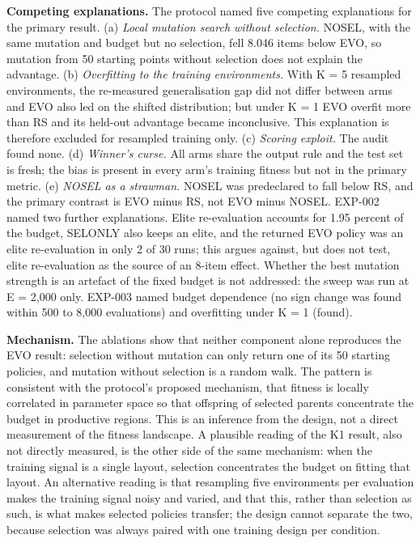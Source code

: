 \documentclass[
]{article}
\begin{document}
\textbf{Competing explanations.} The protocol named five competing
explanations for the primary result. (a) \emph{Local mutation search
without selection.} NOSEL, with the same mutation and budget but no
selection, fell 8.046 items below EVO, so mutation from 50 starting
points without selection does not explain the advantage. (b)
\emph{Overfitting to the training environments.} With K = 5 resampled
environments, the re-measured generalisation gap did not differ between
arms and EVO also led on the shifted distribution; but under K = 1 EVO
overfit more than RS and its held-out advantage became inconclusive.
This explanation is therefore excluded for resampled training only. (c)
\emph{Scoring exploit.} The audit found none. (d) \emph{Winner's curse.}
All arms share the output rule and the test set is fresh; the bias is
present in every arm's training fitness but not in the primary metric.
(e) \emph{NOSEL as a strawman.} NOSEL was predeclared to fall below RS,
and the primary contrast is EVO minus RS, not EVO minus NOSEL. EXP-002
named two further explanations. Elite re-evaluation accounts for 1.95
percent of the budget, SELONLY also keeps an elite, and the returned EVO
policy was an elite re-evaluation in only 2 of 30 runs; this argues
against, but does not test, elite re-evaluation as the source of an
8-item effect. Whether the best mutation strength is an artefact of the
fixed budget is not addressed: the sweep was run at E = 2,000 only.
EXP-003 named budget dependence (no sign change was found within 500 to
8,000 evaluations) and overfitting under K = 1 (found).

\textbf{Mechanism.} The ablations show that neither component alone
reproduces the EVO result: selection without mutation can only return
one of its 50 starting policies, and mutation without selection is a
random walk. The pattern is consistent with the protocol's proposed
mechanism, that fitness is locally correlated in parameter space so that
offspring of selected parents concentrate the budget in productive
regions. This is an inference from the design, not a direct measurement
of the fitness landscape. A plausible reading of the K1 result, also not
directly measured, is the other side of the same mechanism: when the
training signal is a single layout, selection concentrates the budget on
fitting that layout. An alternative reading is that resampling five
environments per evaluation makes the training signal noisy and varied,
and that this, rather than selection as such, is what makes selected
policies transfer; the design cannot separate the two, because selection
was always paired with one training design per condition.
\end{document}
